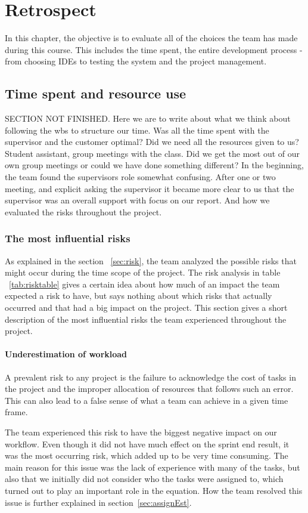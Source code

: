 \chapter{Retrospect}
In this chapter, the objective is to evaluate all of the choices the team has made during this course. This includes the time spent, the entire development process - from choosing IDEs to testing the system and the project management. 


\section{Time spent and resource use}
SECTION NOT FINISHED. Here we are to write about what we think about following the wbs to structure our time. Was all the time spent with the supervisor and the customer optimal? Did we need all the resources given to us? Student assistant, group meetings with the class. Did we get the most out of our own group meetings or could we have done something different?
In the beginning, the team found the supervisors role somewhat confusing. After one or two meeting, and explicit asking the supervisor it became more clear to us that the supervisor was an overall support with focus on our report. And how we evaluated the risks throughout the project.


\subsection{The most influential risks}
As explained in the section ~\ref{sec:risk}, the team analyzed the possible risks that might occur during the time scope of the project. The risk analysis in table ~\ref{tab:risktable} gives a certain idea about how much of an impact the team expected a risk to have, but says nothing about which risks that actually occurred and that had a big impact on the project. This section gives a short description of the most influential risks the team experienced throughout the project.

\subsubsection{Underestimation of workload}
A prevalent risk to any project is the failure to acknowledge the cost of tasks in the project and the improper allocation of resources that follows such an error. This can also lead to a false sense of what a team can achieve in a given time frame. 

The team experienced this risk to have the biggest negative impact on our workflow. Even though it did not have much effect on the sprint end result, it was the most occurring risk, which added up to be very time consuming. The main reason for this issue was the lack of experience with many of the tasks, but also that we initially did not consider who the tasks were assigned to, which turned out to play an important role in the equation. How the team resolved this issue is further explained in section~\ref{sec:assignEst}.

